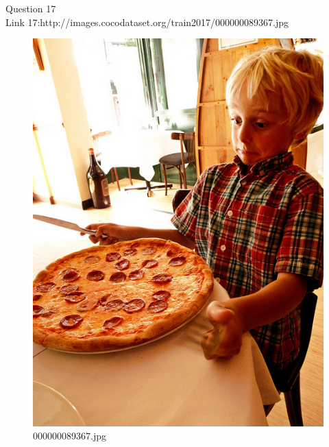 Question 17\\
Link 17:http://images.cocodataset.org/train2017/000000089367.jpg
    \begin{figure}[h]
        \centering
        \includegraphics[width=0.8\linewidth]{../image set/easy/000000089367.jpg}
        \caption{000000089367.jpg}
    \end{figure}
